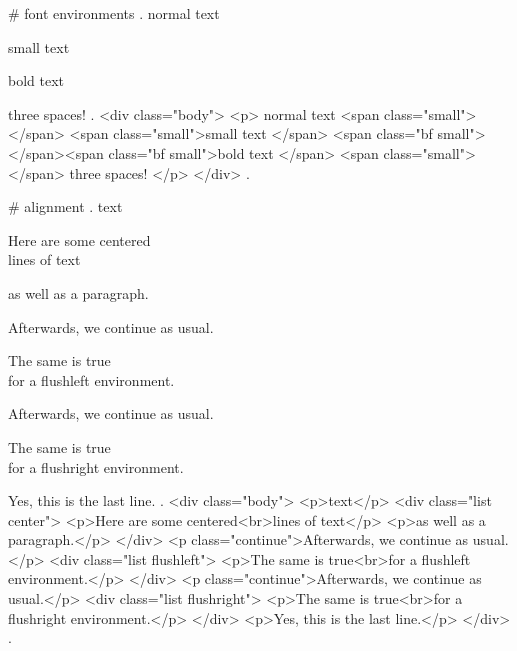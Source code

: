 #
font environments
.
normal text \begin{small}
    small text
    \begin{bfseries}
        bold text
    \end{bfseries}
\end{small}
  three spaces!
.
<div class="body">
<p>
normal text <span class="small">​ </span>
<span class="small">small text </span>
<span class="bf small">​ </span><span class="bf small">bold text </span>
<span class="small">​ </span>​ three spaces!
</p>
</div>
.


#
alignment
.
text
\begin{center}
    Here are some centered\\
    lines of text

    as well as a paragraph.
\end{center}
Afterwards, we continue as usual.
\begin{flushleft}
    The same is true\\
    for a flushleft environment.
\end{flushleft}
Afterwards, we continue as usual.
\begin{flushright}
    The same is true\\
    for a flushright environment.
\end{flushright}

Yes, this is the last line.
.
<div class="body">
<p>text</p>
<div class="list center">
<p>Here are some centered<br>lines of text</p>
<p>as well as a paragraph.</p>
</div>
<p class="continue">Afterwards, we continue as usual.</p>
<div class="list flushleft">
<p>The same is true<br>for a ﬂushleft environment.</p>
</div>
<p class="continue">Afterwards, we continue as usual.</p>
<div class="list flushright">
<p>The same is true<br>for a ﬂushright environment.</p>
</div>
<p>Yes, this is the last line.</p>
</div>
.


